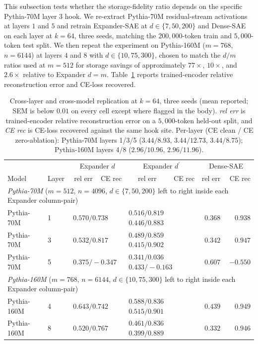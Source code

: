 \documentclass{article}
\theoremstyle{plain}
\theoremstyle{definition}
\theoremstyle{remark}
\begin{document}
This subsection tests whether the storage-fidelity ratio depends on the specific Pythia-70M layer 3 hook. We re-extract Pythia-70M residual-stream activations at layers $1$ and $5$ and retrain Expander-SAE at $d \in \{7, 50, 200\}$ and Dense-SAE on each layer at $k{=}64$, three seeds, matching the $200{,}000$-token train and $5{,}000$-token test split. We then repeat the experiment on Pythia-160M ($m{=}768$, $n{=}6144$) at layers $4$ and $8$ with $d \in \{10, 75, 300\}$, chosen to match the $d/m$ ratios used at $m{=}512$ for storage savings of approximately $77\times$, $10\times$, and $2.6\times$ relative to Expander $d{=}m$. Table~\ref{tab:bench_cross_layer} reports trained-encoder relative reconstruction error and CE-loss recovered.

\begin{table}[h]
    \centering
    \caption{Cross-layer and cross-model replication at $k{=}64$, three seeds (mean reported; SEM is below $0.01$ on every cell except where flagged in the body). \emph{rel err} is trained-encoder relative reconstruction error on a $5{,}000$-token held-out split, and \emph{CE rec} is CE-loss recovered against the same hook site. Per-layer (CE clean / CE zero-ablation): Pythia-70M layers 1/3/5 ($3.44/8.93$, $3.44/12.73$, $3.44/8.75$); Pythia-160M layers 4/8 ($2.96/10.96$, $2.96/11.96$).}
    \label{tab:bench_cross_layer}
    \small
    \setlength{\tabcolsep}{4pt}
    \begin{tabular}{llrrrrrr}
        \toprule
        & & \multicolumn{2}{c}{Expander $d$} & \multicolumn{2}{c}{Expander $d^\prime$} & \multicolumn{2}{c}{Dense-SAE} \\
        Model & Layer & rel err & CE rec & rel err & CE rec & rel err & CE rec \\
        \midrule
        \multicolumn{8}{l}{\emph{Pythia-70M} ($m{=}512$, $n{=}4096$, $d \in \{7, 50, 200\}$ left to right inside each Expander column-pair)} \\
        \midrule
        Pythia-70M  & 1 & \multicolumn{2}{l}{$0.570 / 0.738$} & \multicolumn{2}{l}{$0.516 / 0.819$ \quad $0.446 / 0.883$} & $0.368$ & $0.938$ \\
        Pythia-70M  & 3 & \multicolumn{2}{l}{$0.532 / 0.817$} & \multicolumn{2}{l}{$0.489 / 0.859$ \quad $0.415 / 0.902$} & $0.342$ & $0.947$ \\
        Pythia-70M  & 5 & \multicolumn{2}{l}{$0.375 / -0.347$} & \multicolumn{2}{l}{$0.341 / 0.036$ \quad $0.433 / -0.163$} & $0.607$ & $-0.550$ \\
        \midrule
        \multicolumn{8}{l}{\emph{Pythia-160M} ($m{=}768$, $n{=}6144$, $d \in \{10, 75, 300\}$ left to right inside each Expander column-pair)} \\
        \midrule
        Pythia-160M & 4 & \multicolumn{2}{l}{$0.643 / 0.742$} & \multicolumn{2}{l}{$0.588 / 0.836$ \quad $0.515 / 0.901$} & $0.439$ & $0.949$ \\
        Pythia-160M & 8 & \multicolumn{2}{l}{$0.520 / 0.767$} & \multicolumn{2}{l}{$0.461 / 0.836$ \quad $0.399 / 0.889$} & $0.332$ & $0.946$ \\
        \bottomrule
    \end{tabular}
\end{table}
\end{document}
